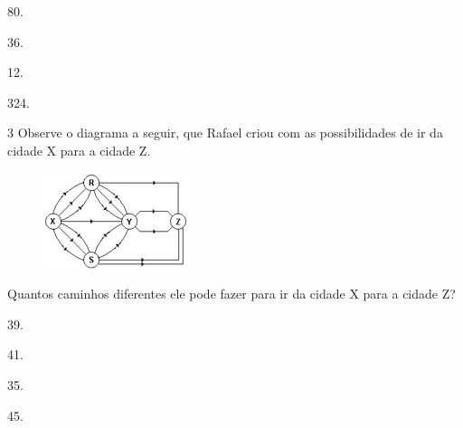 \begin{escolha}
\item
  80.
\item
  36.
\item
  12.
\item
  324.
\end{escolha}

\num{3} Observe o diagrama a seguir, que Rafael criou com as possibilidades de ir
da cidade X para a cidade Z.

\begin{figure}[htpb!]
\centering
\includegraphics[width=.5\textwidth]{media/image75.png}
\end{figure}

Quantos caminhos diferentes ele pode fazer para ir da cidade X para a
cidade Z?

\begin{escolha}
\item
  39.
\item
  41.
\item
  35.
\item
  45.
\end{escolha}


